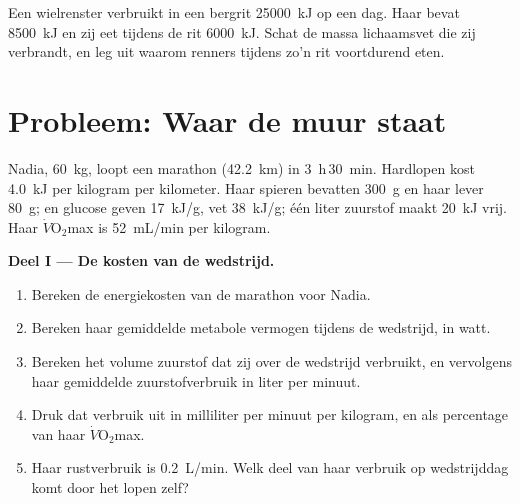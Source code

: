 \begin{exercise}[$\star\star\star$]\label{exo:g10:exercise-and-energy:15}
Een wielrenster verbruikt in een bergrit \qty{25000}{kJ} op een dag. Haar
 bevat \qty{8500}{kJ} en zij eet tijdens de rit \qty{6000}{kJ}.
Schat de massa lichaamsvet die zij verbrandt, en leg uit waarom renners
tijdens zo'n rit voortdurend eten.
\end{exercise}

\section{Probleem: Waar de muur staat}

\begin{problem}
\label{pb:g10:exercise-and-energy:1}
Nadia, \qty{60}{kg}, loopt een marathon (\qty{42.2}{km}) in
\qty{3}{h}\,\qty{30}{min}. Hardlopen kost \qty{4.0}{kJ} per kilogram per
kilometer. Haar spieren bevatten \qty{300}{g}  en haar lever
\qty{80}{g};  en glucose geven \qty{17}{kJ/g}, vet
\qty{38}{kJ/g}; één liter zuurstof maakt \qty{20}{kJ} vrij. Haar
$\dot V\!\mathrm{O_2}$max is \qty{52}{mL/min} per kilogram.

\medskip
\noindent\textbf{Deel I --- De kosten van de wedstrijd.}
\begin{enumerate}
  \item Bereken de energiekosten van de marathon voor Nadia.
  \item Bereken haar gemiddelde metabole vermogen tijdens de wedstrijd,
        in watt.
  \item Bereken het volume zuurstof dat zij over de wedstrijd verbruikt,
        en vervolgens haar gemiddelde zuurstofverbruik in liter per
        minuut.
  \item Druk dat verbruik uit in milliliter per minuut per kilogram, en
        als percentage van haar $\dot V\!\mathrm{O_2}$max.
  \item Haar rustverbruik is \qty{0.2}{L/min}. Welk deel van haar
        verbruik op wedstrijddag komt door het lopen zelf?
\end{enumerate}


\end{problem}
